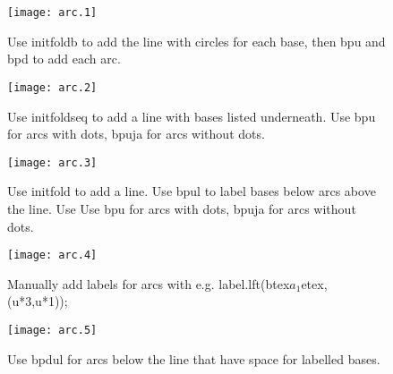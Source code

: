 \documentclass[letterpaper,12pt]{article}
\begin{document}
\begin{figure}
\texttt{[image: arc.1]}
\centering
\caption{Use initfoldb to add the line with circles for each base, then bpu and bpd to add each arc.}
\end{figure}

\begin{figure}
\texttt{[image: arc.2]}
\centering
\caption{Use initfoldseq to add a line with bases listed underneath. Use bpu for arcs with dots, bpuja for arcs without dots.}
\end{figure}

\begin{figure}
\texttt{[image: arc.3]}
\centering
\caption{Use initfold to add a line. Use bpul to label bases below arcs above the line. Use  Use bpu for arcs with dots, bpuja for arcs without dots.}
\end{figure}


\begin{figure}
\texttt{[image: arc.4]}
\centering
\caption{Manually add labels for arcs with e.g. label.lft(btex$a_1$etex,(u*3,u*1));}
\end{figure}

\begin{figure}
\texttt{[image: arc.5]}
\centering
\caption{Use bpdul for arcs below the line that have space for labelled bases. }
\end{figure}
\end{document}
